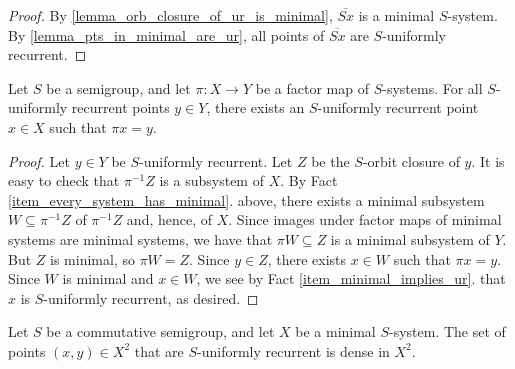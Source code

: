 \begin{proof}
\leanok{}
    By \cref{lemma_orb_closure_of_ur_is_minimal}, $\overline{Sx}$ is a minimal $S$-system.  By \cref{lemma_pts_in_minimal_are_ur}, all points of $\overline{Sx}$ are $S$-uniformly recurrent. 
\end{proof}

\begin{theorem}
    \label{thm_ur_lift}
    \leanok{}
    Let $S$ be a semigroup, and let $\pi: X \to Y$ be a factor map of $S$-systems.  For all $S$-uniformly recurrent points $y \in Y$, there exists an $S$-uniformly recurrent point $x \in X$ such that $\pi x = y$.
\end{theorem}

\begin{proof}
    \leanok{}
    Let $y \in Y$ be $S$-uniformly recurrent. Let $Z$ be the $S$-orbit closure of $y$.  It is easy to check that $\pi^{-1} Z$ is a subsystem of $X$.  By Fact \ref{item_every_system_has_minimal}. above, there exists a minimal subsystem $W \subseteq \pi^{-1} Z$ of $\pi^{-1} Z$ and, hence, of $X$.  Since images under factor maps of minimal systems are minimal systems, we have that $\pi W \subseteq Z$ is a minimal subsystem of $Y$.  But $Z$ is minimal, so $\pi W = Z$.  Since $y \in Z$, there exists $x\in W$ such that $\pi x = y$.  Since $W$ is minimal and $x \in W$, we see by Fact \ref{item_minimal_implies_ur}. that $x$ is $S$-uniformly recurrent, as desired.
\end{proof}

\begin{lemma}
    \label{lemma_dense_S_minimal_points_in_X2}
    \leanok{}
    Let $S$ be a commutative semigroup, and let $X$ be a minimal $S$-system.  The set of points $(x,y) \in X^2$ that are $S$-uniformly recurrent is dense in $X^2$.
\end{lemma}

